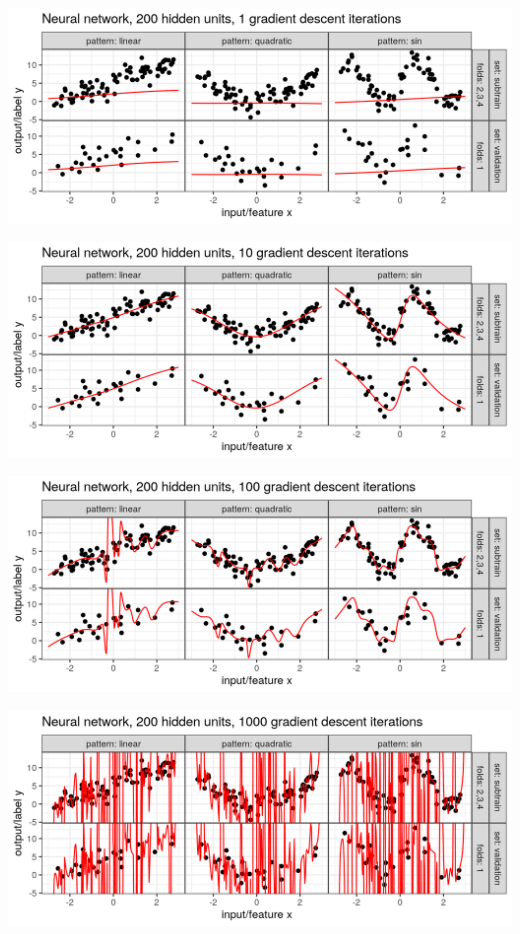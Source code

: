 \begin{frame}
  \includegraphics[width=\textwidth]{figure-overfitting-pred-units=200-maxit=1.png}
\end{frame}


\begin{frame}
  \includegraphics[width=\textwidth]{figure-overfitting-pred-units=200-maxit=10.png}
\end{frame}


\begin{frame}
  \includegraphics[width=\textwidth]{figure-overfitting-pred-units=200-maxit=100.png}
\end{frame}


\begin{frame}
  \includegraphics[width=\textwidth]{figure-overfitting-pred-units=200-maxit=1000.png}
\end{frame}


